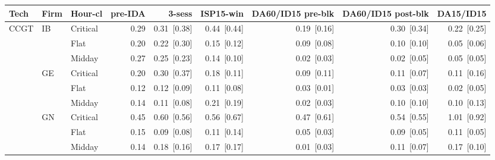 \begin{tabular}{l l l r r r r r r }
\toprule
Tech & Firm & Hour-cl & pre-IDA & 3-sess & ISP15-win & DA60/ID15 pre-blk & DA60/ID15 post-blk & DA15/ID15 \\
\midrule
CCGT & IB & Critical & 0.29 & 0.31~{\color{seasoncol}\scriptsize[0.38]} & 0.44~{\color{seasoncol}\scriptsize[0.44]} & 0.19~{\color{seasoncol}\scriptsize[0.16]} & 0.30~{\color{seasoncol}\scriptsize[0.34]} & 0.22~{\color{seasoncol}\scriptsize[0.25]} \\
 &  & Flat & 0.20 & 0.22~{\color{seasoncol}\scriptsize[0.30]} & 0.15~{\color{seasoncol}\scriptsize[0.12]} & 0.09~{\color{seasoncol}\scriptsize[0.08]} & 0.10~{\color{seasoncol}\scriptsize[0.10]} & 0.05~{\color{seasoncol}\scriptsize[0.06]} \\
 &  & Midday & 0.27 & 0.25~{\color{seasoncol}\scriptsize[0.23]} & 0.14~{\color{seasoncol}\scriptsize[0.10]} & 0.02~{\color{seasoncol}\scriptsize[0.03]} & 0.02~{\color{seasoncol}\scriptsize[0.05]} & 0.05~{\color{seasoncol}\scriptsize[0.05]} \\
 & GE & Critical & 0.20 & 0.30~{\color{seasoncol}\scriptsize[0.37]} & 0.18~{\color{seasoncol}\scriptsize[0.11]} & 0.09~{\color{seasoncol}\scriptsize[0.11]} & 0.11~{\color{seasoncol}\scriptsize[0.07]} & 0.11~{\color{seasoncol}\scriptsize[0.16]} \\
 &  & Flat & 0.12 & 0.12~{\color{seasoncol}\scriptsize[0.09]} & 0.11~{\color{seasoncol}\scriptsize[0.08]} & 0.03~{\color{seasoncol}\scriptsize[0.01]} & 0.03~{\color{seasoncol}\scriptsize[0.03]} & 0.02~{\color{seasoncol}\scriptsize[0.05]} \\
 &  & Midday & 0.14 & 0.11~{\color{seasoncol}\scriptsize[0.08]} & 0.21~{\color{seasoncol}\scriptsize[0.19]} & 0.02~{\color{seasoncol}\scriptsize[0.03]} & 0.10~{\color{seasoncol}\scriptsize[0.10]} & 0.10~{\color{seasoncol}\scriptsize[0.13]} \\
 & GN & Critical & 0.45 & 0.60~{\color{seasoncol}\scriptsize[0.56]} & 0.56~{\color{seasoncol}\scriptsize[0.67]} & 0.47~{\color{seasoncol}\scriptsize[0.61]} & 0.54~{\color{seasoncol}\scriptsize[0.55]} & 1.01~{\color{seasoncol}\scriptsize[0.92]} \\
 &  & Flat & 0.15 & 0.09~{\color{seasoncol}\scriptsize[0.08]} & 0.11~{\color{seasoncol}\scriptsize[0.14]} & 0.05~{\color{seasoncol}\scriptsize[0.03]} & 0.09~{\color{seasoncol}\scriptsize[0.05]} & 0.11~{\color{seasoncol}\scriptsize[0.05]} \\
 &  & Midday & 0.14 & 0.18~{\color{seasoncol}\scriptsize[0.16]} & 0.17~{\color{seasoncol}\scriptsize[0.17]} & 0.01~{\color{seasoncol}\scriptsize[0.03]} & 0.11~{\color{seasoncol}\scriptsize[0.07]} & 0.17~{\color{seasoncol}\scriptsize[0.10]} \\

\end{tabular}
